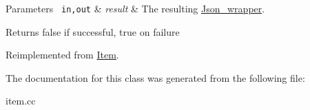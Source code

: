 \begin{DoxyParams}[1]{Parameters}
\mbox{\texttt{ in,out}}  & {\em result} & The resulting \mbox{\hyperlink{classJson__wrapper}{Json\+\_\+wrapper}}.\\
\hline
\end{DoxyParams}
\begin{DoxyReturn}{Returns}
false if successful, true on failure 
\end{DoxyReturn}


Reimplemented from \mbox{\hyperlink{classItem_a57e763fcde2d0a819d21e31c59611290}{Item}}.



The documentation for this class was generated from the following file\+:\begin{DoxyCompactItemize}
\item 
item.\+cc\end{DoxyCompactItemize}

